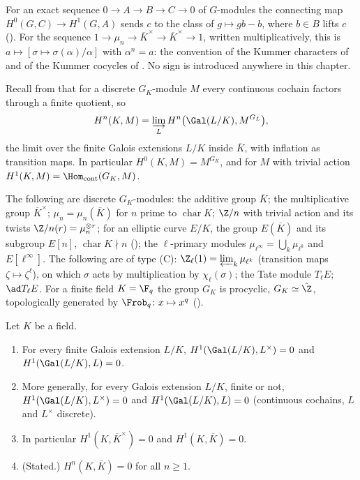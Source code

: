 \begin{convention}\label{conv:galcoh:signs}
For an exact sequence $0\to A\to B\to C\to0$ of $G$-modules the connecting map $H^0(G,C)\to H^1(G,A)$ sends $c$ to the class of $g\mapsto gb-b$, where $b\in B$
lifts $c$ (). For the sequence $1\to\mu_n\to\overline K^\times\to\overline K^\times\to1$, written multiplicatively, this is
$a\mapsto[\sigma\mapsto\sigma(\alpha)/\alpha]$ with $\alpha^n=a$: the convention of the Kummer characters of  and of the Kummer cocycles of
. No sign is introduced anywhere in this chapter.
\end{convention}

Recall from  that for a discrete $G_K$-module $M$ every continuous cochain factors through a finite quotient, so
\begin{equation}\label{eq:galcoh:direct-limit}
H^n(K,M)=\varinjlim_LH^n\bigl(\Gal(L/K),M^{G_L}\bigr),
\end{equation}
the limit over the finite Galois extensions $L/K$ inside $\overline K$, with inflation as transition maps. In particular $H^0(K,M)=M^{G_K}$, and for $M$ with trivial action
$H^1(K,M)=\Hom_{\mathrm{cont}}(G_K,M)$.

\begin{example}\label{ex:galcoh:galois-modules}
The following are discrete $G_K$-modules: the additive group $\overline K$; the multiplicative group $\overline K^\times$; $\mu_n=\mu_n(\overline K)$ for $n$ prime to
$\operatorname{char}K$; $\Z/n$ with trivial action and its twists $\Z/n(r)=\mu_n^{\otimes r}$; for an elliptic curve $E/K$, the group $E(\overline K)$ and its
subgroup $E[n]$, $\operatorname{char}K\nmid n$ (); the $\ell$-primary modules $\mu_{\ell^\infty}=\bigcup_k\mu_{\ell^k}$ and $E[\ell^\infty]$. The
following are of type (C): $\Z_\ell(1)=\varprojlim_k\mu_{\ell^k}$ (transition maps $\zeta\mapsto\zeta^\ell$), on which $\sigma$ acts by multiplication by $\chi_\ell(\sigma)$;
the Tate module $T_\ell E$; $\ad T_\ell E$. For a finite field $K=\F_q$ the group $G_K$ is procyclic, $G_K\simeq\hat\Z$, topologically generated by
$\Frob_q\colon x\mapsto x^q$ ().
\end{example}

\begin{theorem}\label{thm:galcoh:hilbert90}
Let $K$ be a field.
\begin{enumerate}[label=(\roman*)]
\item For every finite Galois extension $L/K$, $H^1(\Gal(L/K),L^\times)=0$ and $H^1(\Gal(L/K),L)=0$.
\item More generally, for every Galois extension $L/K$, finite or not, $H^1(\Gal(L/K),L^\times)=0$ and $H^1(\Gal(L/K),L)=0$ (continuous cochains, $L$ and
$L^\times$ discrete).
\item In particular $H^1(K,\overline K^\times)=0$ and $H^1(K,\overline K)=0$.
\item (Stated.) $H^n(K,\overline K)=0$ for all $n\ge1$.
\end{enumerate}
\end{theorem}

